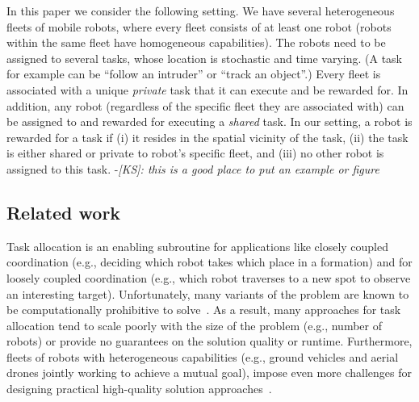 \documentclass[conference]{IEEEtran}
\newcommand{\ksline}[2]{{\color{blue}#1}{\em \color{blue}[KS]: #2}}
\newcommand{\ksline}[2]{#1}
\begin{document}
In this paper we consider the following setting. We have several heterogeneous fleets of mobile robots, where every fleet consists of at least one robot (robots within the same fleet have homogeneous capabilities). The robots need to be assigned to several tasks, whose location is stochastic and time varying. (A task for example can be ``follow an intruder'' or ``track an object''.) Every fleet is associated with a unique \emph{private} task that it can execute and be rewarded for. In addition, any robot (regardless of the specific fleet they are associated with) can be assigned to and rewarded for executing a \emph{shared} task. In our setting, a robot is rewarded for a task if (i) it resides in the spatial vicinity of the task, (ii) the task is either shared or private to robot's specific fleet, and (iii) no other robot is assigned to this task. \ksline{-}{this is a good place to put an example or figure}

\subsection{Related work}
Task allocation is an enabling subroutine for applications like closely coupled coordination (e.g., deciding which robot takes which place in a formation) and for loosely coupled coordination (e.g., which robot traverses to a new spot to observe an interesting target). Unfortunately, many variants of the problem are known to be computationally prohibitive to solve~\cite{GerkeyMataric04,KorashETAL13}. As a result, many approaches for task allocation tend to scale poorly with the size of the problem (e.g., number of robots) or provide no guarantees on the solution quality or runtime. Furthermore, fleets of robots with heterogeneous capabilities (e.g., ground vehicles and aerial drones jointly working to achieve a mutual goal), impose even more challenges for designing practical high-quality solution approaches~\cite{BaiETAL20,AgatzETAL18,FerrandezETAL16,MurrayChu15,Wang2017}. 
\end{document}

